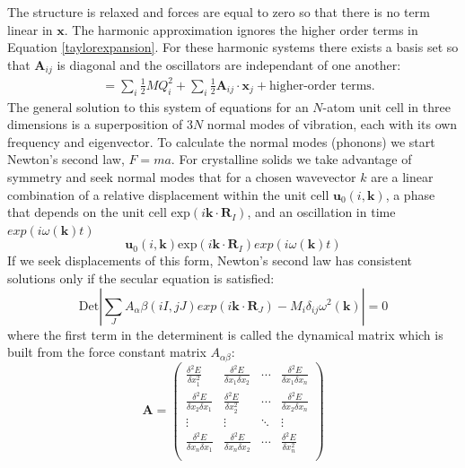 The structure is relaxed and forces are equal to zero so that there is no term linear in $\textbf{x}$. The harmonic approximation ignores the higher order terms in Equation \ref{taylorexpansion}. For these harmonic systems there exists a basis set so that $\textbf{A}_{ij}$ is diagonal and the oscillators are independant of one another:
\begin{align} \label{independentoscillators}
&=\sum_i\frac{1}{2}MQ_i^2+\sum_{i}\frac{1}{2}\textbf{A}_{ij}\cdot\textbf{x}_j+\textrm{higher-order terms}.
\end{align}
The general solution to this system of equations for an $N$-atom unit cell in three dimensions is a superposition of $3N$ normal modes of vibration, each with its own frequency and eigenvector.
To calculate the normal modes (phonons) we start Newton's second law, $F=ma$. For crystalline solids we take advantage of symmetry and seek normal modes that for a chosen wavevector $k$ are a linear combination of a relative displacement within the unit cell $\textbf{u}_0(i,\textbf{k})$, a phase that depends on the unit cell $\textrm{exp}(i\textbf{k}\cdot\textbf{R}_I)$, and an oscillation in time $exp(i\omega(\textbf{k})t)$
\begin{equation} \label{normalmodes}
\textbf{u}_0(i,\textbf{k})\textrm{exp}(i\textbf{k}\cdot\textbf{R}_I)exp(i\omega(\textbf{k})t)
\end{equation}
If we seek displacements of this form, Newton's second law has consistent solutions only if the secular equation is satisfied:
\begin{equation}
\textrm{Det}|\sum_J A_{\alpha}{\beta}(iI,jJ)exp(i\textbf{k}\cdot\textbf{R}_J)-M_i\delta_{ij}\omega^2(\textbf{k})|=0
\end{equation}
where the first term in the determinent is called the dynamical matrix which is built from the force constant matrix $A_{\alpha\beta}$:
\begin{equation} \label{forceconstant}
\textbf{A} = 
\begin{pmatrix} 
\frac{\delta^2E}{\delta x_1^2} &\frac{\delta^2E}{\delta x_1 \delta x_2} & \cdots & \frac{\delta^2E}{\delta x_1 \delta x_n}\\
\frac{\delta^2E}{\delta x_2 \delta x_1}&\frac{\delta^2E}{\delta x_2^2} & \cdots & \frac{\delta^2E}{\delta x_2 \delta x_n}\\
\vdots & \vdots & \ddots & \vdots \\
\frac{\delta^2E}{\delta x_n \delta x_1}&\frac{\delta^2E}{\delta x_n \delta x_2} & \cdots & \frac{\delta^2E}{\delta x_n^2}\\
\end{pmatrix}
\end{equation}


